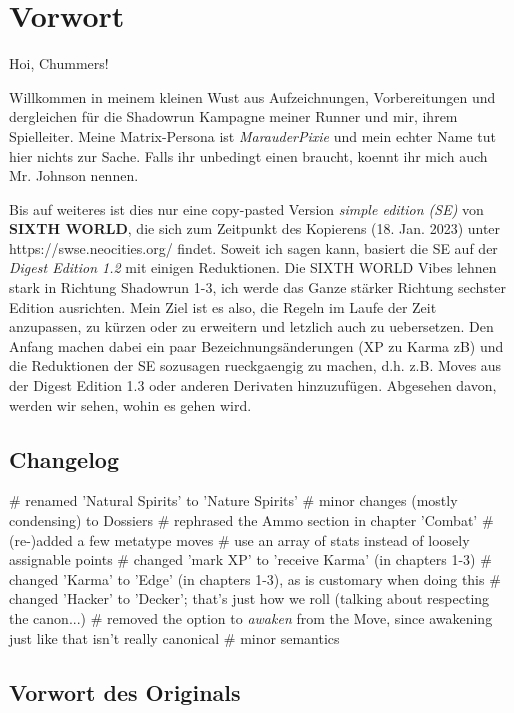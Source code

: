 \chapter{Vorwort}

Hoi, Chummers!

Willkommen in meinem kleinen Wust aus Aufzeichnungen, Vorbereitungen und dergleichen für die Shadowrun Kampagne meiner Runner und mir, ihrem Spielleiter. Meine Matrix-Persona ist \textit{MarauderPixie} und mein echter Name tut hier nichts zur Sache. Falls ihr unbedingt einen braucht, koennt ihr mich auch Mr. Johnson nennen.

Bis auf weiteres ist dies nur eine copy-pasted Version \textit{simple edition (SE)} von \textbf{SIXTH WORLD}, die sich zum Zeitpunkt des Kopierens (18. Jan. 2023) unter https://swse.neocities.org/ findet. Soweit ich sagen kann, basiert die SE auf der \textit{Digest Edition 1.2} mit einigen Reduktionen. Die SIXTH WORLD Vibes lehnen stark in Richtung Shadowrun 1-3, ich werde das Ganze stärker Richtung sechster Edition ausrichten. Mein Ziel ist es also, die Regeln im Laufe der Zeit anzupassen, zu kürzen oder zu erweitern und letzlich auch zu uebersetzen. Den Anfang machen dabei ein paar Bezeichnungsänderungen (XP zu Karma zB) und die Reduktionen der SE sozusagen rueckgaengig zu machen, d.h. z.B. Moves aus der Digest Edition 1.3 oder anderen Derivaten hinzuzufügen. Abgesehen davon, werden wir sehen, wohin es gehen wird. 

\section{Changelog}

\begin{easylist}
# renamed 'Natural Spirits' to 'Nature Spirits'
# minor changes (mostly condensing) to Dossiers
# rephrased the Ammo section in chapter 'Combat'
# (re-)added a few metatype moves
# use an array of stats instead of loosely assignable points
# changed 'mark XP' to 'receive Karma' (in chapters 1-3)
# changed 'Karma' to 'Edge' (in chapters 1-3), as is customary when doing this
# changed 'Hacker' to 'Decker'; that's just how we roll (talking about respecting the canon...)
# removed the option to \textit{awaken} from the  Move, since awakening just like that isn't really canonical
# minor semantics
\end{easylist}


\section{Vorwort des Originals}

